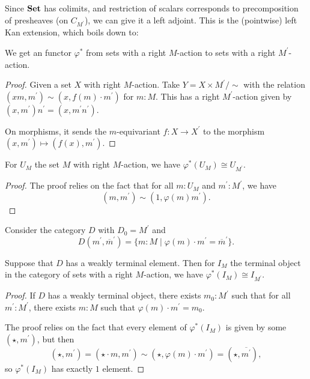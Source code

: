 Since $ \mathbf{Set} $ has colimits, and restriction of scalars corresponds to precomposition of presheaves (on $ C_{M^\prime} $), we can give it a left adjoint. This is the (pointwise) left Kan extension, which boils down to:

\begin{lemma}
  We get an  functor $ \varphi^* $ from sets with a right $ M $-action to sets with a right $ M^\prime $-action.
\end{lemma}
\begin{proof}
  Given a set $ X $ with right $ M $-action. Take $ Y = X \times M^\prime / \sim $ with the relation $ (x m, m^\prime) \sim (x, f(m) \cdot m^\prime) $ for $ m: M $. This has a right $ M^\prime $-action given by $ (x, m^\prime)n^\prime = (x, m^\prime n^\prime) $.

  On morphisms, it sends the $ m $-equivariant $ f: X \to X^\prime $ to the morphism $ (x, m^\prime) \mapsto (f(x), m^\prime) $.
\end{proof}

\begin{lemma}\label{lem:scalar-extension-monoid-monoid-action}
  For $ U_M $ the set $ M $ with right $ M $-action, we have $ \varphi^*(U_M) \cong U_{M^\prime} $.
\end{lemma}
\begin{proof}
  The proof relies on the fact that for all $ m: U_M $ and $ m^\prime : M^\prime $, we have
  \[ (m, m^\prime) \sim (1, \varphi(m) m^\prime). \]
\end{proof}

Consider the category $ D $ with $ D_0 = M^\prime $ and
\[ D(m^\prime, \overline m^\prime) = \{ m: M \mid \varphi(m) \cdot m^\prime = \overline m^\prime \}. \]

\begin{lemma}\label{lem:scalar-extension-terminal}
  Suppose that $ D $ has a weakly terminal element. Then for $ I_M $ the terminal object in the category of sets with a right $ M $-action, we have $ \varphi^*(I_M) \cong I_{M^\prime} $.
\end{lemma}
\begin{proof}
  If $ D $ has a weakly terminal object, there exists $ m_0 : M^\prime $ such that for all $ m^\prime: M^\prime $, there exists $ m: M $ such that $ \varphi(m) \cdot m^\prime = m_0 $.

  The proof relies on the fact that every element of $ \varphi^*(I_M) $ is given by some $ (\star, m^\prime) $, but then
  \[ (\star, m^\prime) = (\star \cdot m, m^\prime) \sim (\star, \varphi(m) \cdot m^\prime) = (\star, \overline{m^\prime}), \]
  so $ \varphi^*(I_M) $ has exactly $ 1 $ element.
\end{proof}

